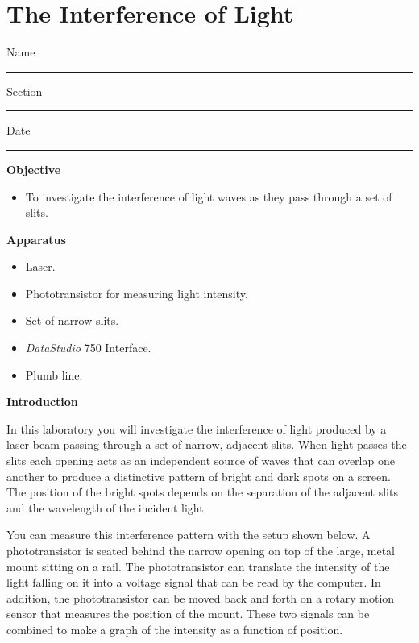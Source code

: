 
\section{The Interference of Light}

Name \rule{2.0in}{0.1pt}\hfill{}Section \rule{1.0in}{0.1pt}\hfill{}Date
\rule{1.0in}{0.1pt}

\textbf{Objective}

\begin{itemize}
\item To investigate the interference of light waves as they pass through
a set of slits. 
\end{itemize}
\textbf{Apparatus}

\begin{itemize}
\item Laser.
\item Phototransistor for measuring light intensity.
\item Set of narrow slits.
\item {\it DataStudio} 750 Interface.
\item Plumb line.
\end{itemize}
\textbf{Introduction}

In this laboratory you will investigate the interference of light
produced by a laser beam passing through a set of narrow, adjacent
slits. When light passes the slits each opening acts as an independent
source of waves that can overlap one another to produce a distinctive
pattern of bright and dark spots on a screen. The position of the
bright spots depends on the separation of the adjacent slits and the
wavelength of the incident light. 

You can measure this interference pattern with the setup shown below.
A phototransistor is seated behind the narrow opening on top of the large,
metal mount sitting on a rail. The phototransistor can translate the intensity of the
light falling on it into a voltage signal that can be read by the
computer. In addition, the phototransistor can be moved back and
forth on a rotary motion sensor that measures the position of the 
mount.
These two signals can be combined to
make a graph of the intensity as a function of position.

\vspace{0.3cm}
{\centering {} \par}
\vspace{0.3cm}

